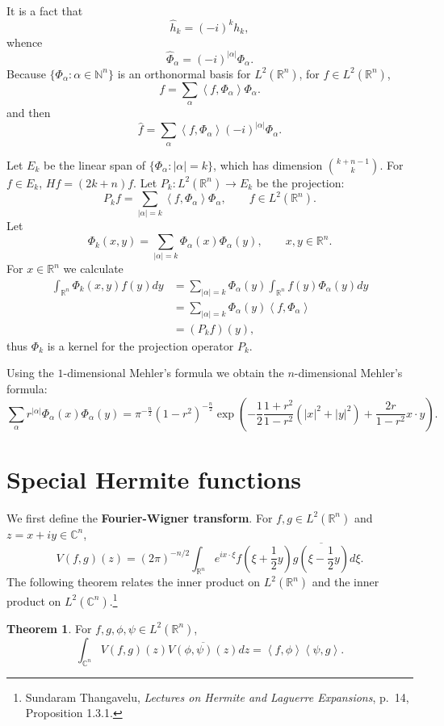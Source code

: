 \documentclass{article}
\newcommand{\inner}[2]{\left\langle #1, #2 \right\rangle}
\theoremstyle{definition}
\newtheorem{theorem}{Theorem}
\theoremstyle{definition}
\begin{document}
It is a fact that
\[
\widehat{h}_k = (-i)^k h_k,
\]
whence
\[
\widehat{\Phi}_\alpha = (-i)^{|\alpha|} \Phi_\alpha.
\]
Because $\{\Phi_\alpha: \alpha \in \mathbb{N}^n\}$ is an orthonormal basis for 
$L^2(\mathbb{R}^n)$, for $f \in L^2(\mathbb{R}^n)$, 
\[
f = \sum_{\alpha} \inner{f}{\Phi_\alpha} \Phi_\alpha.
\]
and 
then
\[
\widehat{f} = \sum_{\alpha} \inner{f}{\Phi_\alpha} (-i)^{|\alpha|} \Phi_\alpha.
\]


Let $E_k$ be the linear span of $\{\Phi_\alpha: |\alpha| = k\}$, which has dimension
$\binom{k+n-1}{k}$. 
For $f \in E_k$, $Hf = (2k+n)f$. 
Let $P_k:L^2(\mathbb{R}^n) \to E_k$ be the projection:
\[
P_k f = \sum_{|\alpha|=k} \inner{f}{\Phi_\alpha} \Phi_\alpha,
\qquad f \in L^2(\mathbb{R}^n).
\]
Let
\[
\Phi_k(x,y) = \sum_{|\alpha|=k} \Phi_\alpha(x) \Phi_\alpha(y),
\qquad x,y \in \mathbb{R}^n.
\]
For $x \in \mathbb{R}^n$ we calculate
\begin{align*}
\int_{\mathbb{R}^n} \Phi_k(x,y) f(y) dy&=
\sum_{|\alpha|=k}\Phi_\alpha(y) \int_{\mathbb{R}^n} f(y) \Phi_\alpha(y) dy\\
&=\sum_{|\alpha|=k} \Phi_\alpha(y) \inner{f}{\Phi_\alpha}\\
&=(P_k f)(y),
\end{align*}
thus $\Phi_k$ is a kernel for the projection operator $P_k$. 

Using the $1$-dimensional Mehler's formula  we obtain the $n$-dimensional
Mehler's formula:
\[
\sum_{\alpha} r^{|\alpha|} \Phi_\alpha(x) \Phi_\alpha(y) = \pi^{-\frac{n}{2}} (1-r^2)^{-\frac{n}{2}} 
\exp\left(-\frac{1}{2} \frac{1+r^2}{1-r^2} (|x|^2+|y|^2)+\frac{2r}{1-r^2} x\cdot y\right).
\]



\section{Special Hermite functions}
We first define the \textbf{Fourier-Wigner transform}. For $f,g \in L^2(\mathbb{R}^n)$ and $z=x+iy \in \mathbb{C}^n$,
\[
V(f,g)(z) = (2\pi)^{-n/2} \int_{\mathbb{R}^n} e^{ix\cdot \xi} f\left(\xi+\frac{1}{2}y\right) \overline{g\left(\xi-\frac{1}{2}y\right)} d\xi.
\]
The following theorem relates the inner product on $L^2(\mathbb{R}^n)$ and the inner product on $L^2(\mathbb{C}^n)$.\footnote{Sundaram Thangavelu, {\em Lectures on Hermite and Laguerre Expansions},
p.~14, Proposition 1.3.1.}

\begin{theorem}
For $f,g,\phi,\psi \in L^2(\mathbb{R}^n)$,
\[
\int_{\mathbb{C}^n} V(f,g)(z) \overline{V(\phi,\psi)(z)} dz = \inner{f}{\phi} \inner{\psi}{g}.
\]
\end{theorem}
\end{document}
